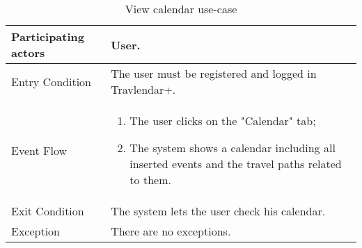 \begin{table}[H]
	\begin{center}
		\begin{tabular}{ | p{} | p{} | }
		\hline
		Participating actors & User.\\
		\hline
		Entry Condition & The user must be registered and logged in Travlendar+.\\
		\hline
		Event Flow & 
			\begin{enumerate}
				\item The user clicks on the "Calendar" tab;
				\item The system shows a calendar including all inserted events and the travel paths related to them.
			\end{enumerate} \\
		\hline
		Exit Condition & The system lets the user check his calendar. \\
		\hline
		Exception & There are no exceptions.\\ 
		\hline
		\end{tabular}
	\end{center}
	\caption{View calendar use-case}
\end{table}